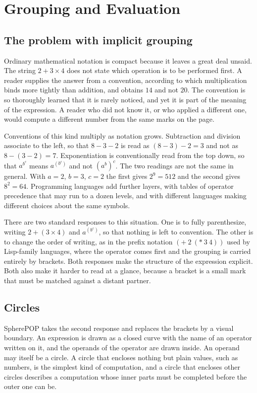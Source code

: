\chapter{Grouping and Evaluation}
\label{ch:grouping}

\section{The problem with implicit grouping}

Ordinary mathematical notation is compact because it leaves a great deal unsaid. The string $2 + 3 \times 4$ does not state which operation is to be performed first. A reader supplies the answer from a convention, according to which multiplication binds more tightly than addition, and obtains $14$ and not $20$. The convention is so thoroughly learned that it is rarely noticed, and yet it is part of the meaning of the expression. A reader who did not know it, or who applied a different one, would compute a different number from the same marks on the page.

Conventions of this kind multiply as notation grows. Subtraction and division associate to the left, so that $8 - 3 - 2$ is read as $(8-3)-2 = 3$ and not as $8-(3-2) = 7$. Exponentiation is conventionally read from the top down, so that $a^{b^c}$ means $a^{(b^c)}$ and not $(a^b)^c$. The two readings are not the same in general. With $a = 2$, $b = 3$, $c = 2$ the first gives $2^{9} = 512$ and the second gives $8^{2} = 64$. Programming languages add further layers, with tables of operator precedence that may run to a dozen levels, and with different languages making different choices about the same symbols.

There are two standard responses to this situation. One is to fully parenthesize, writing $2 + (3 \times 4)$ and $a^{(b^c)}$, so that nothing is left to convention. The other is to change the order of writing, as in the prefix notation $(\mathtt{+}\ 2\ (\mathtt{*}\ 3\ 4))$ used by Lisp-family languages, where the operator comes first and the grouping is carried entirely by brackets. Both responses make the structure of the expression explicit. Both also make it harder to read at a glance, because a bracket is a small mark that must be matched against a distant partner.

\section{Circles}

SpherePOP takes the second response and replaces the brackets by a visual boundary. An expression is drawn as a closed curve with the name of an operator written on it, and the operands of the operator are drawn inside. An operand may itself be a circle. A circle that encloses nothing but plain values, such as numbers, is the simplest kind of computation, and a circle that encloses other circles describes a computation whose inner parts must be completed before the outer one can be.


